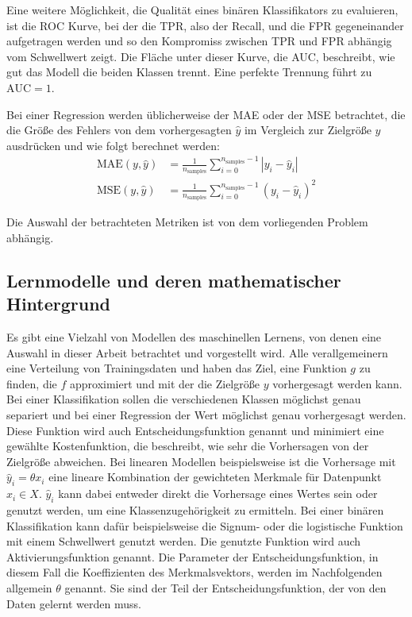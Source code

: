 	Eine weitere Möglichkeit, die Qualität eines binären Klassifikators zu evaluieren, ist die \ac{ROC} Kurve, bei der die \ac{TPR}, also der Recall, und die \ac{FPR} gegeneinander aufgetragen werden und so den Kompromiss zwischen \ac{TPR} und \ac{FPR} abhängig vom Schwellwert zeigt. Die Fläche unter dieser Kurve, die \ac{AUC}, beschreibt, wie gut das Modell die beiden Klassen trennt. Eine perfekte Trennung führt zu $\text{AUC} = 1$.
	
	Bei einer Regression werden üblicherweise der \ac{MAE} oder der \ac{MSE} betrachtet, die die Größe des Fehlers von dem vorhergesagten $\hat{y}$ im Vergleich zur Zielgröße $y$ ausdrücken und wie folgt berechnet werden:
	\begin{align*}
		\text{MAE}(y, \hat{y}) &= \frac{1}{n_{\text{samples}}} \sum_{i=0}^{n_{\text{samples}}-1} \left| y_i - \hat{y}_i \right| \\
		\text{MSE}(y, \hat{y}) &= \frac{1}{n_\text{samples}} \sum_{i=0}^{n_\text{samples} - 1} (y_i - \hat{y}_i)^2		
	\end{align*}
	
	Die Auswahl der betrachteten Metriken ist von dem vorliegenden Problem abhängig. %

	\subsection{Lernmodelle und deren mathematischer Hintergrund}
	
		Es gibt eine Vielzahl von Modellen des maschinellen Lernens, von denen eine Auswahl in dieser Arbeit betrachtet und vorgestellt wird. Alle verallgemeinern eine Verteilung von Trainingsdaten und haben das Ziel, eine Funktion $g$ zu finden, die $f$ approximiert und mit der die Zielgröße $y$ vorhergesagt werden kann. Bei einer Klassifikation sollen die verschiedenen Klassen möglichst genau separiert und bei einer Regression der Wert möglichst genau vorhergesagt werden. Diese Funktion wird auch Entscheidungsfunktion genannt und minimiert eine gewählte Kostenfunktion, die beschreibt, wie sehr die Vorhersagen von der Zielgröße abweichen. Bei linearen Modellen beispielsweise ist die Vorhersage mit $\hat{y}_i = \theta x_i$ eine lineare Kombination der gewichteten Merkmale für Datenpunkt $x_i \in X$. $\hat{y}_i$ kann dabei entweder direkt die Vorhersage eines Wertes sein oder genutzt werden, um eine Klassenzugehörigkeit zu ermitteln. Bei einer binären Klassifikation kann dafür beispielsweise die Signum- oder die logistische Funktion mit einem Schwellwert genutzt werden. Die genutzte Funktion wird auch Aktivierungsfunktion genannt. Die Parameter der Entscheidungsfunktion, in diesem Fall die Koeffizienten des Merkmalsvektors, werden im Nachfolgenden allgemein $\theta$ genannt. Sie sind der Teil der Entscheidungsfunktion, der von den Daten gelernt werden muss.
		

